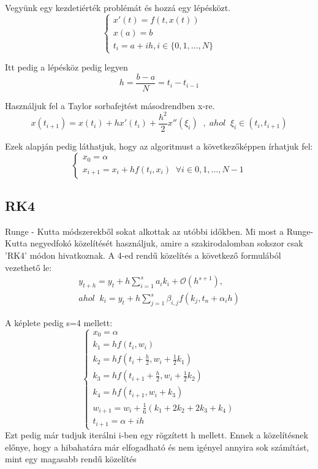 \documentclass{article}
\theoremstyle{definition}
\theoremstyle{theorem}
\begin{document}
Vegyünk egy kezdetiérték problémát és hozzá egy lépésközt.
\begin{equation*}
    \begin{cases}
       x'(t) = f(t,x(t))\\
       x(a) = b \\
       t_i = a + ih , i \in \{0,1,...,N\}
    \end{cases}       
\end{equation*}

Itt pedig a lépésköz pedig legyen \[h = \frac{b-a}{N} = t_i - t_{i-1} \]

Használjuk fel a Taylor sorbafejtést másodrendben x-re.
\begin{equation*}
    x(t_{i+1}) = x(t_i) + h x'(t_i) + \frac{h^2}{2} x''(\xi_i) \;\;,\;ahol \;\;\xi _i \in (t_i, t_{i+1})
\end{equation*}

Ezek alapján pedig láthatjuk, hogy az algoritmust a következőképpen írhatjuk fel:
\begin{equation*}
    \begin{cases}
        x_0 = \alpha \\
        x_{i+1} = x_i + h f(t_i,x_i) \;\;\forall i \in{0,1,...,N-1}
    \end{cases}       
\end{equation*}
\subsection{RK4}
Runge - Kutta módszerekből sokat alkottak az utóbbi időkben. Mi most a Runge-Kutta negyedfokó közelítését használjuk, amire a szakirodalomban sokszor csak 'RK4' módon hivatkoznak. A 4-ed rendű közelítés a következő formulából vezethető le:
\begin{equation*}
\begin{split}
      y_{t+h} = y_t + h \sum_{i=1}^{s} a_i k_i + \mathcal{O}(h^{s+1}),\\ 
      ahol\;\;k_i = y_t + h \sum_{j=1}^{s} \beta_{i,j} f(k_j,t_n + \alpha_ih)  
\end{split}
\end{equation*}

A képlete pedig s=4 mellett:
\begin{equation*}
\begin{cases}
        x_0 = \alpha \\
        k_1 = h f(t_i,w_i) \\
        k_2 = h f(t_i + \frac{h}{2}, w_i + \frac{1}{2} k_1) \\
        k_3 = h f(t_{i + 1} + \frac{h}{2}, w_i + \frac{1}{2} k_2) \\
        k_4 = h f(t_{i + 1}, w_i + k_3)\\
        w_{i+1} = w_i + \frac{1}{6}(k_1 + 2k_2 + 2k_3 + k_4)\\
        t_{i+1} = \alpha + ih
\end{cases}
\end{equation*}
Ezt pedig már tudjuk iterálni i-ben egy rögzített h mellett. Ennek a közelítésnek előnye, hogy a hibahatára már elfogadható és nem igényel annyira sok számítást, mint egy magasabb rendű közelítés
\end{document}
